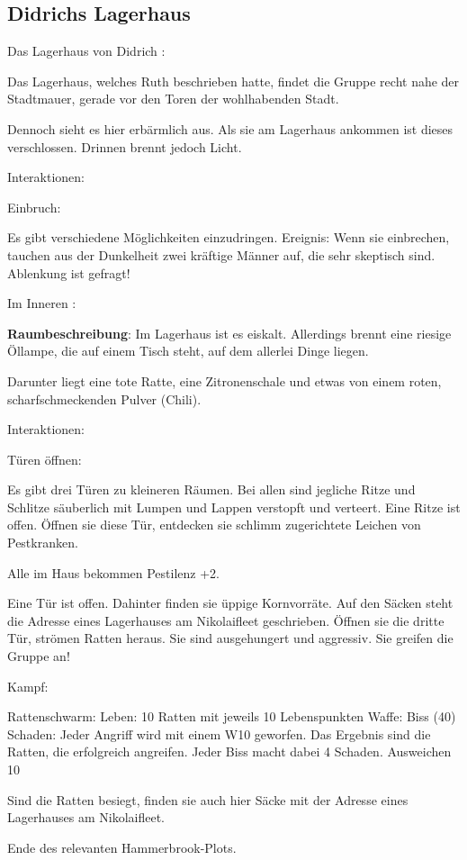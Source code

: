 \subsection{Didrichs Lagerhaus}
\label{Lagerhaus}


Das Lagerhaus von Didrich
:

Das Lagerhaus, welches Ruth beschrieben hatte, findet die Gruppe recht nahe der Stadtmauer, gerade vor den Toren der wohlhabenden Stadt.

Dennoch sieht es hier erbärmlich aus. Als sie am Lagerhaus ankommen ist dieses verschlossen. Drinnen brennt jedoch Licht.

Interaktionen:

Einbruch:

Es gibt verschiedene Möglichkeiten einzudringen.
Ereignis: Wenn sie einbrechen, tauchen aus der Dunkelheit zwei kräftige Männer auf, die sehr skeptisch sind. Ablenkung ist gefragt!


Im Inneren
:

\textbf{Raumbeschreibung}: Im Lagerhaus ist es eiskalt. Allerdings brennt eine riesige Öllampe, die auf einem Tisch steht, auf dem allerlei Dinge liegen.

Darunter liegt eine tote Ratte, eine Zitronenschale und etwas von einem roten, scharfschmeckenden Pulver (Chili).

Interaktionen:

Türen öffnen:

Es gibt drei Türen zu kleineren Räumen. Bei allen sind jegliche Ritze und Schlitze säuberlich mit Lumpen und Lappen verstopft und verteert. Eine Ritze ist offen.
Öffnen sie diese Tür, entdecken sie schlimm zugerichtete Leichen von Pestkranken.

Alle im Haus bekommen Pestilenz +2.

Eine Tür ist offen. Dahinter finden sie üppige Kornvorräte. Auf den Säcken steht die Adresse eines Lagerhauses am Nikolaifleet geschrieben.
Öffnen sie die dritte Tür, strömen Ratten heraus. Sie sind ausgehungert und aggressiv. Sie greifen die Gruppe an!

Kampf:

Rattenschwarm:
Leben: 10 Ratten mit jeweils 10 Lebenspunkten
Waffe: Biss (40)
Schaden: Jeder Angriff wird mit einem W10 geworfen. Das Ergebnis sind die Ratten, die erfolgreich angreifen. Jeder Biss macht dabei 4 Schaden.
Ausweichen 10

Sind die Ratten besiegt, finden sie auch hier Säcke mit der Adresse eines Lagerhauses am Nikolaifleet.

Ende des relevanten Hammerbrook-Plots.
